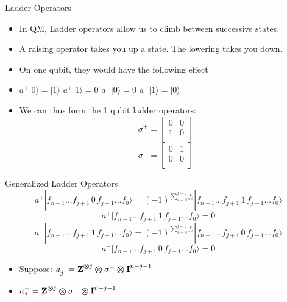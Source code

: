\begin{frame}{Ladder Operators}
\begin{itemize}
    \item In QM, Ladder operators allow us to climb between successive states.
    \item A raising operator takes you up a state. The lowering takes you down. 
    \item On one qubit, they would have the following effect
    \item $a^+|0\rangle = |1\rangle$ \quad $a^+|1\rangle = 0$ \quad \quad \quad \quad $a^- |0\rangle = 0$ \quad $a^- |1\rangle = |0\rangle$
    \item We can thus form the 1 qubit ladder operators:
    \[\sigma^+ = \begin{bmatrix}
        0 & 0 \\
        1 & 0 \\
    \end{bmatrix}
    \] \quad \quad \[\sigma^- = \begin{bmatrix}
        0 & 1 \\
        0 & 0 \\
    \end{bmatrix}
    \]
\end{itemize}

\end{frame}

\begin{frame}{Generalized Ladder Operators}
    \begin{equation}
        a^+ |f_{n-1}...f_{j+1}\, 0\, f_{j-1}...f_0\rangle = (-1)^{\sum_{s=0}^{j-1}{f_s}}|f_{n-1}...f_{j+1}\, 1 \, f_{j-1}...f_0\rangle
    \end{equation}
    \begin{equation}
        a^+ |f_{n-1}...f_{j+1}\, 1 \, f_{j-1}...f_0\rangle = 0
    \end{equation}
    \begin{equation}
        a^- |f_{n-1}...f_{j+1}\, 1\, f_{j-1}...f_0\rangle = (-1)^{\sum_{s=0}^{j-1}{f_s}}|f_{n-1}...f_{j+1}\, 0 \, f_{j-1}...f_0\rangle
    \end{equation}
    \begin{equation}
            a^- |f_{n-1}...f_{j+1}\, 0 \, f_{j-1}...f_0\rangle = 0
    \end{equation}

    \begin{itemize}
        \item Suppose: $a_j^+ = \mbox{\bfseries{\textrm{Z}}}^{\bm{\otimes} j}\bm{\otimes} \sigma^+ \bm{\otimes} \mbox{\bfseries{\textrm{I}}}^{n-j-1}$
        \item $a_j^- = \mbox{\bfseries{\textrm{Z}}}^{\bm{\otimes} j}\bm{\otimes} \sigma^- \bm{\otimes} \mbox{\bfseries{\textrm{I}}}^{n-j-1}$
    \end{itemize}
\end{frame}

